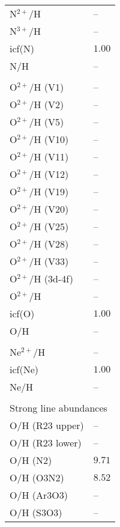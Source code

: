 \begin{longtable}[l]{ll}
 N$^{2+}$/H                          & -- \\
 N$^{3+}$/H                          & -- \\
 icf(N)                              & $  1.00$\\
 N/H                                 & -- \\
 \\
 O$^{2+}$/H (V1)                     & -- \\
 O$^{2+}$/H (V2)                     & -- \\
 O$^{2+}$/H (V5)                     & -- \\
 O$^{2+}$/H (V10)                    & -- \\
 O$^{2+}$/H (V11)                    & -- \\
 O$^{2+}$/H (V12)                    & -- \\
 O$^{2+}$/H (V19)                    & -- \\
 O$^{2+}$/H (V20)                    & -- \\
 O$^{2+}$/H (V25)                    & -- \\
 O$^{2+}$/H (V28)                    & -- \\
 O$^{2+}$/H (V33)                    & -- \\
 O$^{2+}$/H (3d-4f)                  & -- \\
 O$^{2+}$/H                          & -- \\
 icf(O)                              & $  1.00$\\
 O/H                                 & -- \\
 \\
 Ne$^{2+}$/H                         & -- \\
 icf(Ne)                             & $  1.00$\\
 Ne/H                                & -- \\
 \vspace{0.2cm}\\\multicolumn{2}{l}{Strong line abundances}\\ \hline
 O/H (R23 upper)                     & -- \\
 O/H (R23 lower)                     & -- \\
 O/H (N2)                            & $  9.71$\\
 O/H (O3N2)                          & $  8.52$\\
 O/H (Ar3O3)                         & -- \\
 O/H (S3O3)                          & -- \\

\end{longtable}
